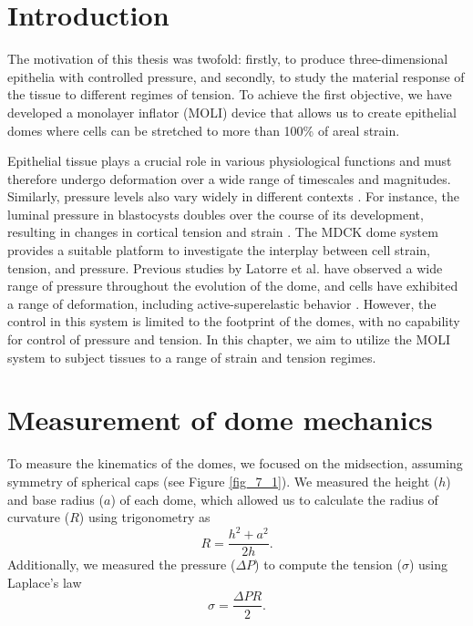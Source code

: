 \hypertarget{introduction}{%
\section{Introduction}\label{introduction2}}

The motivation of this thesis was twofold: firstly, to produce three-dimensional epithelia with controlled pressure, and secondly, to study the material response of the tissue to different regimes of tension. To achieve the first objective, we have developed a monolayer inflator (MOLI) device that allows us to create epithelial domes where cells can be stretched to more than 100\% of areal strain.

Epithelial tissue plays a crucial role in various physiological functions and must therefore undergo deformation over a wide range of timescales and magnitudes. Similarly, pressure levels also vary widely in different contexts \cite{torres-sanchez2021, choudhury2022a}. For instance, the luminal pressure in blastocysts doubles over the course of its development, resulting in changes in cortical tension and strain \cite{chan2019}. The MDCK dome system provides a suitable platform to investigate the interplay between cell strain, tension, and pressure. Previous studies by Latorre et al. have observed a wide range of pressure throughout the evolution of the dome, and cells have exhibited a range of deformation, including active-superelastic behavior \cite{latorre2018}. However, the control in this system is limited to the footprint of the domes, with no capability for control of pressure and tension. In this chapter, we aim to utilize the MOLI system to subject tissues to a range of strain and tension regimes.

\hypertarget{measurement-of-dome-mechanics}{%
	\section{Measurement of dome
		mechanics}\label{measurement-of-dome-mechanics}}


To measure the kinematics of the domes, we focused on the midsection, assuming symmetry of spherical caps (see Figure \ref{fig_7_1}). We measured the height ($h$) and base radius ($a$) of each dome, which allowed us to calculate the radius of curvature ($R$) using trigonometry as
\begin{equation}
	\label{eqn:radiuscurve}
	R = \frac{h^2 + a^2}{2h}.
\end{equation}
Additionally, we measured the pressure ($\Delta P$) to compute the tension ($\sigma$) using Laplace's law
\begin{equation}
	\label{eqn:laplace}
	\sigma = \frac{\Delta PR }{2} .
\end{equation}


